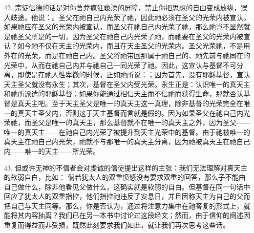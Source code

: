 42. 宗徒信德的话是对你鲁莽疯狂亵渎的屏障，禁止你把思想的自由变成放纵，误入歧途。他说：。圣父在祂自己内光荣了祂，因此祂必须在圣父的光荣内被宣认。如果祂应在圣父的光荣内被宣认，而圣父在祂自己内光荣了祂，那么祂岂不显然就是祂圣父所是的一切，因为圣父在祂自己内光荣了祂，而祂要在圣父的光荣内被宣认？如今祂不仅在天主的光荣内，而且在天主圣父的光荣内。圣父光荣祂，不是用外在的光荣，而是在祂自己内。圣父将祂带回那属于祂自己的、祂先前与祂同在的光荣中，从而在祂自己内并与祂自己一同光荣了祂。因此，这宣认与基督不可分离，即使是在祂人性卑微的时候，正如祂所说：；因为首先，没有耶稣基督，宣认天主圣父就没有永生；其次，基督在圣父内受光荣。永生正是：认识唯一的真天主和祂所派遣的耶稣基督；如果你能通过相信天主而不信祂而获得生命，那就否认基督是真天主吧。至于天主圣父是唯一的真天主这一真理，除非基督的光荣完全在唯一的真天主圣父内，否则这于天主基督而言就是假的。因为如果圣父在祂自己内光荣祂，而圣父是唯一的真天主，那么基督就不在唯一的真天主之外，因为圣父——唯一的真天主——在祂自己内光荣了被提升到天主光荣中的基督。由于祂被唯一的真天主在祂自己内光荣，祂就不与那唯一的真天主分离，因为祂被真天主在祂自己内——唯一的天主——所光荣。\par

43. 但或许无神的不信者会对虔诚的信徒提出这样的主张：我们无法理解对真天主的软弱自白，比如： 倘若犹太人的双重愤怒没有要求双重的回答，那么子不能由自己做什么，除非他看见父做什么，这确实就是软弱的自白。但基督在同一句话中回应了犹太人的双重指控，他们指控祂违反了安息日，并且因称天主为自己的父而把自己与天主同等。那么，你是否认为，通过将注意力集中在祂答复的形式上，就能将其内容抽离？我们已在另一本书中讨论过这段经文；然而，由于信仰的阐述因重复而得益而非受损，既然此刻要求我们如此，就让我们再次思考这些话。\par


